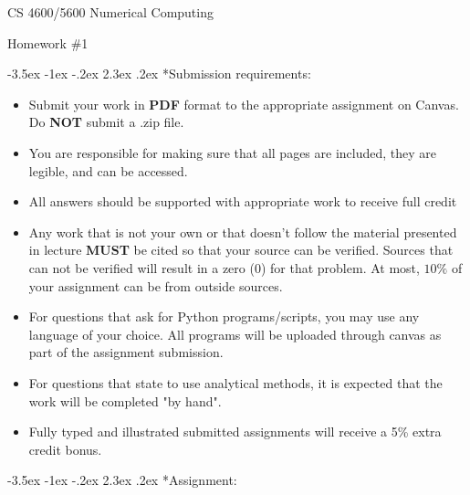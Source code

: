 \documentclass[11pt]{article}
\makeatletter
\renewcommand\section{\@startsection{section}{1}{\z@}%
                                  {-3.5ex \@plus -1ex \@minus -.2ex}%
                                  {2.3ex \@plus.2ex}%
                                  {\normalfont\large\bfseries}}
\renewcommand\section{\@startsection{section}{1}{\z@}%
                                  {-3.5ex \@plus -1ex \@minus -.2ex}%
                                  {2.3ex \@plus.2ex}%
                                  {\normalfont\large\bfseries}}
\makeatother
\begin{document}
 

\chead{}

\begin{center}\begin{Large}
CS 4600/5600 Numerical Computing

Homework \#1

\end{Large}
\end{center}

\section*{Submission requirements:}
\begin{itemize}
\item Submit your work in \textbf{PDF} format to the appropriate assignment on Canvas. Do \textbf{NOT} submit a .zip file. 
\item You are responsible for making sure that all pages are included, they are legible, and can be accessed. 
\item All answers should be supported with appropriate work to receive full credit
\item Any work that is not your own or that doesn't follow the material presented in lecture \textbf{MUST} be cited so that your source can be verified. Sources that can not be verified will result in a zero (0) for that problem. At most, $10\%$ of your assignment can be from outside sources. 
\item For questions that ask for Python programs/scripts, you may use any language of your choice. All programs will be uploaded through canvas as part of the assignment submission.
\item For questions that state to use analytical methods, it is expected that the work will be completed "by hand".
\item Fully typed and illustrated submitted assignments will receive a 5\% extra credit bonus.
\end{itemize}

\section*{Assignment:}
\end{document}

